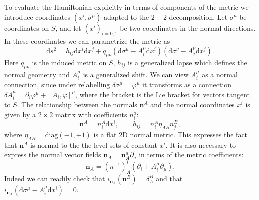\documentclass[a4paper,11pt]{article}
\newcommand{\be}{\begin{equation}}
\newcommand{\ee}{\end{equation}}
\def\n{\bm{n}}
\def\rd{\mathrm{d}}
\begin{document}
To evaluate the Hamiltonian  explicitly in terms of components of the metric we introduce coordinates $(x^i,\sigma^\mu)$ adapted to the $2+2$ decomposition.
Let $\sigma^\mu$ be coordinates on $S$, and let $(x^{i})_{i=0,1}$ be two coordinates in the normal directions.
In these coordinates we can parametrize the metric as
\be
\rd s^{2} = h_{ij}\rd x^{i}\rd x^{j} + q_{\mu \nu}\left(\rd \sigma^\mu - A^\mu_{i}\rd x^{i}\right)
\left(\rd \sigma^\nu - A^\nu_{j}\rd x^{j}\right).
\ee
Here $q_{\mu \nu}$ is the induced metric on $S$, $h_{ij}$ is a generalized lapse which defines the normal geometry and $A_i^\mu$ is a generalized shift.
We can view $A_i^\mu$ as a normal connection, since under relabelling $\delta \sigma^\mu =\varphi^\mu$ it transforms as a connection $ \delta A_i^\mu = \partial_i \varphi^\mu + [A_i,\varphi]^\mu$, where the bracket is the Lie bracket for vectors tangent to $S$.
The relationship between the normals $\n^A$ and the normal coordinates $x^i$ is given by a $2 \times 2$ matrix with coefficients $n^a_{i}$:
\be
\n^{A}= n^{A}_{i} \rd x^{i},\qquad h_{ij} = n^A_i\eta_{AB}n^B_j,
\ee
where $\eta_{AB}=\mathrm{diag}(-1,+1)$ is a flat 2D normal metric.
This expresses the fact that $\n^A$ is normal to the the level sets of constant $x^{i}$.
It is also necessary to express the normal vector fields $\n_A = \n_A^a \partial_a$ in terms of the metric coefficients:
\begin{equation}\label{normal}
\n_A = (n^{-1})^{i}_{A}(\partial_{i}+A_{i}^{\mu}\partial_{\mu}).
\end{equation}
Indeed we can readily check that $i_{\n_A} (\n^B) =\delta_A^B$ and that 
$i_{\n_A}(\rd \sigma^\mu - A^\mu_i\rd x^i) = 0$.
\end{document}
